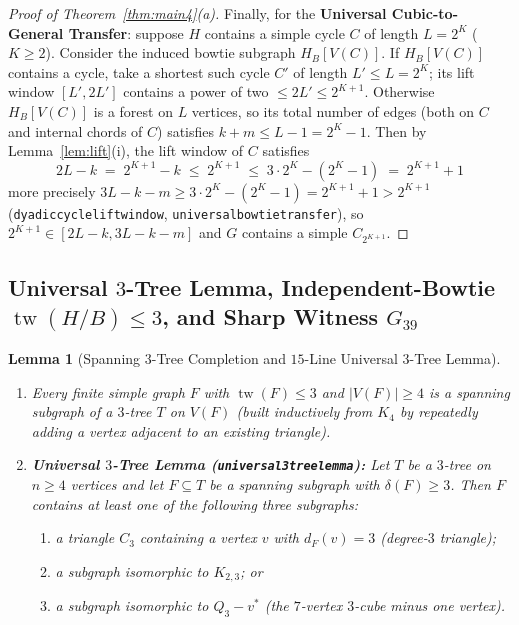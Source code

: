 \documentclass[11pt,reqno]{amsart}
\theoremstyle{plain}
\newtheorem{lemma}[theorem]{Lemma}
\theoremstyle{definition}
\theoremstyle{remark}
\newcommand{\tw}{\operatorname{tw}}
\DeclareRobustCommand{\_}{\ifmmode\text{\textunderscore}\else\textunderscore\allowbreak\fi}
\begin{document}
\begin{proof}[Proof of Theorem~\ref{thm:main4}(a)]
Finally, for the \textbf{Universal Cubic-to-General Transfer}: suppose $H$ contains a simple cycle $C$ of length $L = 2^K$ ($K \ge 2$). Consider the induced bowtie subgraph $H_B[V(C)]$. If $H_B[V(C)]$ contains a cycle, take a shortest such cycle $C'$ of length $L' \le L = 2^K$; its lift window $[L', 2L']$ contains a power of two $\le 2L' \le 2^{K+1}$. Otherwise $H_B[V(C)]$ is a forest on $L$ vertices, so its total number of edges (both on $C$ and internal chords of $C$) satisfies $k + m \le L - 1 = 2^K - 1$. Then by Lemma~\ref{lem:lift}(i), the lift window of $C$ satisfies
\[
  2L - k \;=\; 2^{K+1} - k \;\le\; 2^{K+1} \;\le\; 3 \cdot 2^K - (2^K - 1) \;=\; 2^{K+1} + 1
\]
more precisely $3L - k - m \ge 3 \cdot 2^K - (2^K - 1) = 2^{K+1} + 1 > 2^{K+1}$ (\texttt{dyadic\_cycle\_lift\_window}, \texttt{universal\_bowtie\_transfer}), so $2^{K+1} \in [2L - k, 3L - k - m]$ and $G$ contains a simple $C_{2^{K+1}}$.
\end{proof}

\subsection{Universal \texorpdfstring{$3$}{3}-Tree Lemma, Independent-Bowtie \texorpdfstring{$\tw(H/B) \le 3$}{tw(H/B) <= 3}, and Sharp Witness \texorpdfstring{$G_{39}$}{G39}}\label{subsec:tw3}

\begin{lemma}[Spanning $3$-Tree Completion and $15$-Line Universal $3$-Tree Lemma]\label{lem:3tree}
\leavevmode
\begin{enumerate}[label=(\roman*),leftmargin=2.2em]
  \item Every finite simple graph $F$ with $\tw(F) \le 3$ and $|V(F)| \ge 4$ is a spanning subgraph of a $3$-tree $T$ on $V(F)$ (built inductively from $K_4$ by repeatedly adding a vertex adjacent to an existing triangle).
  \item \textbf{Universal $3$-Tree Lemma (\texttt{universal\_3tree\_lemma}):} Let $T$ be a $3$-tree on $n \ge 4$ vertices and let $F \subseteq T$ be a spanning subgraph with $\delta(F) \ge 3$. Then $F$ contains at least one of the following three subgraphs:
  \begin{enumerate}[label=(\alph*),leftmargin=2em]
    \item a triangle $C_3$ containing a vertex $v$ with $d_F(v) = 3$ (\emph{degree-$3$ triangle});
    \item a subgraph isomorphic to $K_{2,3}$; or
    \item a subgraph isomorphic to $Q_3 - v^*$ (the $7$-vertex $3$-cube minus one vertex).
  \end{enumerate}
\end{enumerate}
\end{lemma}
\end{document}
